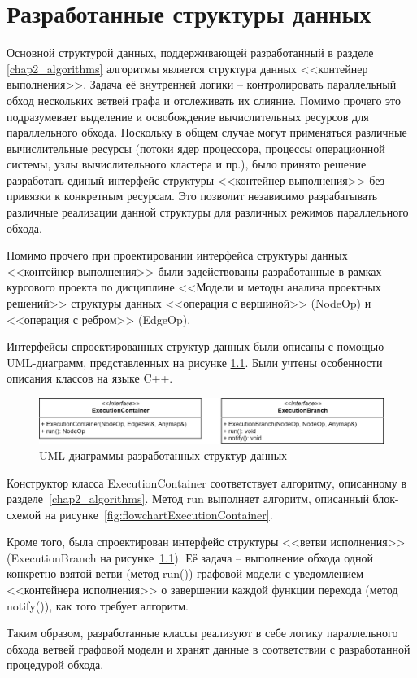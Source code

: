 \chapter{Разработанные структуры данных}\label{chap3_soft_architecture}
Основной структурой данных, поддерживающей разработанный в разделе \ref{chap2_algorithms} алгоритмы является структура данных <<контейнер выполнения>>. Задача её внутренней логики -- контролировать параллельный обход нескольких ветвей графа и отслеживать их слияние. Помимо прочего это подразумевает выделение и освобождение вычислительных ресурсов для параллельного обхода. Поскольку в общем случае могут применяться различные вычислительные ресурсы (потоки ядер процессора, процессы операционной системы, узлы вычислительного кластера и пр.), было принято решение разработать единый интерфейс структуры <<контейнер выполнения>> без привязки к конкретным ресурсам. Это позволит независимо разрабатывать различные реализации данной структуры для различных режимов параллельного обхода. 

Помимо прочего при проектировании интерфейса структуры данных <<контейнер выполнения>> были задействованы разработанные в рамках курсового проекта по дисциплине <<Модели и методы анализа проектных решений>> структуры данных <<операция с вершиной>> (\textsf{NodeOp}) и <<операция с ребром>> (\textsf{EdgeOp})\cite{TrishinMMAPS2022}.

Интерфейсы спроектированных структур данных были описаны с помощью UML-диаграмм, представленных на рисунке \ref{fig:UMLAll}. Были учтены особенности описания классов на языке C++.

\begin{figure}
    \centering
    \includegraphics[width=\textwidth]{figures/UML.all.png}
    \caption{UML-диаграммы разработанных структур данных}
    \label{fig:UMLAll}
\end{figure}

Конструктор класса \textsf{ExecutionContainer} соответствует алгоритму, описанному в разделе~\ref{chap2_algorithms}. Метод run выполняет алгоритм, описанный блок-схемой на рисунке~\ref{fig:flowchartExecutionContainer}.

Кроме того, была спроектирован интерфейс структуры <<ветви исполнения>> (\textsf{ExecutionBranch} на рисунке~\ref{fig:UMLAll}). Её задача -- выполнение обхода одной конкретно взятой ветви (метод \textsf{run()}) графовой модели с уведомлением <<контейнера исполнения>> о завершении каждой функции перехода (метод \textsf{notify()}), как того требует алгоритм.

Таким образом, разработанные классы реализуют в себе логику параллельного обхода ветвей графовой модели и хранят данные в соответствии с разработанной процедурой обхода.


